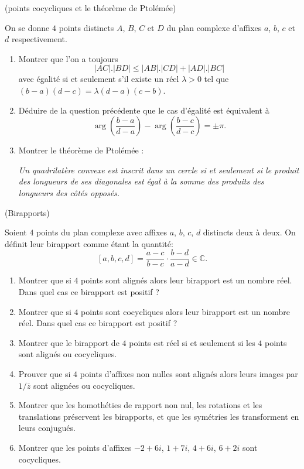 \documentclass[a4paper,12pt,reqno]{amsart}
\begin{document}
\begin{exo} (points cocycliques et le théorème de Ptolémée)

  On se donne $4$ points distincts $A$, $B$, $C$ et $D$ du plan complexe d'affixes $a$, $b$, $c$ et $d$ respectivement.
  \begin{enumerate}
    \item Montrer que l'on a toujours
      $$
        |AC|.|BD| \leq |AB|.|CD|+|AD|.|BC|
      $$
      avec égalité si et seulement s'il existe un réel $\lambda > 0$ tel que $(b-a)(d-c)=\lambda (d-a)(c-b)$.
    \item Déduire de la question précédente que le cas d'égalité est équivalent à
      $$
        \arg(\frac{b-a}{d-a})-\arg(\frac{b-c}{d-c}) = \pm\pi.
      $$
    \item Montrer le théorème de Ptolémée :

    \textit{Un quadrilatère convexe est inscrit dans un cercle si et seulement si le produit des longueurs de ses diagonales est égal à la somme des produits des longueurs des côtés opposés.}
  \end{enumerate}
 \end{exo}


\begin{exo} (Birapports)

  Soient $4$ points du plan complexe avec affixes $a$, $b$, $c$, $d$ distincts deux à deux. On définit leur birapport comme étant la quantité:
  $$
    [a,b,c,d]=\frac{a-c}{b-c}\cdot\frac{b-d}{a-d} \in \mathbb{C}.
  $$
  \begin{enumerate}
    \item Montrer que si $4$ points sont alignés alors leur birapport est un nombre réel. Dans quel cas ce birapport est positif ?
    \item Montrer que si $4$ points sont cocycliques alors leur birapport est un nombre réel. Dans quel cas ce birapport est positif ?
    \item Montrer que le birapport de $4$ points est réel si et seulement si les $4$ points sont alignés ou cocycliques.
    \item Prouver que si $4$ points d'affixes non nulles sont alignés alors leurs images par $1/\overline{z}$ sont alignées ou cocycliques.
    \item Montrer que les homothéties de rapport non nul, les rotations et les translations préservent les birapports, et que les symétries les transforment en leurs conjugués.
    \item Montrer que les points d'affixes $-2+6i$, $1+7i$, $4+6i$, $6+2i$ sont cocycliques.
  \end{enumerate}
\end{exo}
\end{document}
